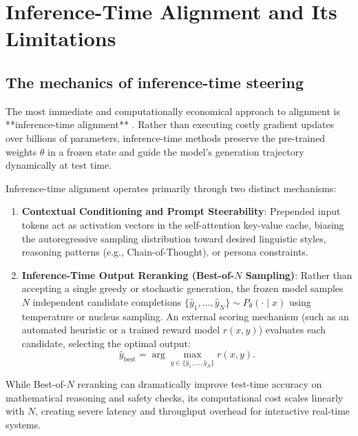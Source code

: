 \documentclass[../../main.tex]{subfiles}
\begin{document}
\section{Inference-Time Alignment and Its Limitations}
\label{sec:inference_time_alignment_limits}

\subsection{The mechanics of inference-time steering}
\label{subsec:mechanics_inference_alignment}

The most immediate and computationally economical approach to alignment is **inference-time alignment** \citep{xiao2025}. Rather than executing costly gradient updates over billions of parameters, inference-time methods preserve the pre-trained weights $\theta$ in a frozen state and guide the model's generation trajectory dynamically at test time.

Inference-time alignment operates primarily through two distinct mechanisms:
\begin{enumerate}
    \item \textbf{Contextual Conditioning and Prompt Steerability}: Prepended input tokens act as activation vectors in the self-attention key-value cache, biasing the autoregressive sampling distribution toward desired linguistic styles, reasoning patterns (e.g., Chain-of-Thought), or persona constraints.
    \item \textbf{Inference-Time Output Reranking (Best-of-$N$ Sampling)}: Rather than accepting a single greedy or stochastic generation, the frozen model samples $N$ independent candidate completions $\{\hat{y}_1, \dots, \hat{y}_N\} \sim P_\theta(\cdot \mid x)$ using temperature or nucleus sampling. An external scoring mechanism (such as an automated heuristic or a trained reward model $r(x, y)$) evaluates each candidate, selecting the optimal output:
    \begin{equation}
    \hat{y}_{\text{best}} = \arg\max_{y \in \{\hat{y}_1, \dots, \hat{y}_N\}} r(x, y).
    \end{equation}
\end{enumerate}
While Best-of-$N$ reranking can dramatically improve test-time accuracy on mathematical reasoning and safety checks, its computational cost scales linearly with $N$, creating severe latency and throughput overhead for interactive real-time systems.
\end{document}
